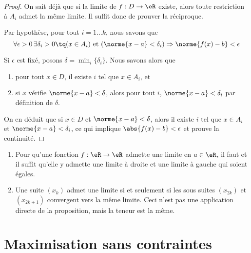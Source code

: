 \begin{proof}On sait déjà que si la limite de $f : D \to \eR$
  existe, alors toute restriction à $A_i$ admet la même limite. Il
  suffit donc de prouver la réciproque.

  Par hypothèse, pour tout $i = 1 \ldots k$, nous savons que
  \begin{equation*}
    \forall \epsilon > 0\, \exists \delta_i > 0 \tq (x \in A_i)
    \text{ et }
    (\norme{x-a} < \delta_i) \Rightarrow \norme{f(x) - b} < \epsilon
  \end{equation*}

  Si $\epsilon$ est fixé, posons $\delta = \min_i\{\delta_i\}$. Nous
  savons alors que
  \begin{enumerate}
  \item pour tout $x \in D$, il existe $i$ tel que $x \in A_i$, et
  \item si $x$ vérifie $\norme{x-a} < \delta$, alors pour tout $i$,
    $\norme{x-a} < \delta_i$ par définition de $\delta$.
  \end{enumerate}
  
  On en déduit que si $x \in D$ et $\norme{x-a} < \delta$, alors il
  existe $i$ tel que $x \in A_i$ et $\norme{x-a} < \delta_i$, ce qui
  implique $\abs{f(x) - b} < \epsilon$ et prouve la continuité.
\end{proof}

\begin{example}
  \begin{enumerate}
  \item Pour qu'une fonction $f : \eR \to \eR$ admette une limite en
    $a \in \eR$, il faut et il suffit qu'elle y admette une limite à
    droite et une limite à gauche qui soient égales.

  \item Une suite $(x_k)$ admet une limite si et seulement si les
    sous suites $(x_{2k})$ et $(x_{2k+1})$ convergent vers la même
    limite. Ceci n'est pas une application directe de la proposition,
    mais la teneur est la même.
  \end{enumerate}
\end{example}

					\section{Maximisation sans contraintes}

